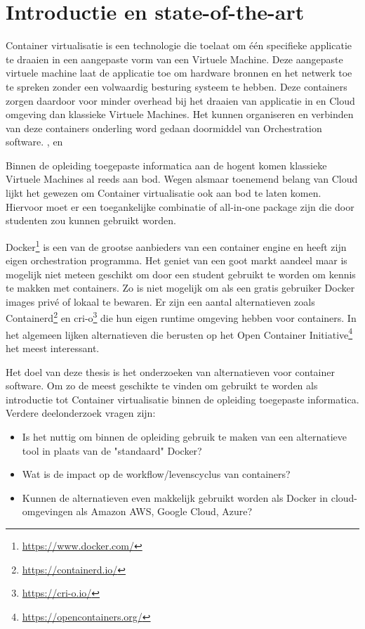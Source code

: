 
\section{Introductie en state-of-the-art} %
\label{sec:introductie}

Container virtualisatie is een technologie die toelaat om één specifieke applicatie te draaien in een aangepaste vorm van een Virtuele Machine. Deze aangepaste virtuele machine laat de applicatie toe om hardware bronnen en het netwerk toe te spreken zonder een volwaardig besturing systeem te hebben. Deze containers zorgen daardoor voor minder overhead bij het draaien van applicatie in en Cloud omgeving dan klassieke Virtuele Machines. Het kunnen organiseren en verbinden van deze containers onderling word gedaan doormiddel van Orchestration software. \autocite{eder2016hypervisor}, \autocite{silva2018cont} en \autocite{truyen2019comprehensive}

Binnen de opleiding toegepaste informatica aan de hogent komen klassieke Virtuele Machines al reeds aan bod. Wegen alsmaar toenemend belang van Cloud lijkt het gewezen om Container virtualisatie ook aan bod te laten komen. Hiervoor moet er een toegankelijke combinatie of all-in-one package zijn die door studenten zou kunnen gebruikt worden.

Docker\footnote{\url{https://www.docker.com/}} is een van de grootse aanbieders van een container engine en heeft zijn eigen orchestration programma. Het geniet van een goot markt aandeel maar is mogelijk niet meteen geschikt om door een student gebruikt te worden om kennis te makken met containers. Zo is niet mogelijk om als een gratis gebruiker Docker images privé of lokaal te bewaren. Er zijn een aantal alternatieven zoals Containerd\footnote{\url{https://containerd.io/}} en cri-o\footnote{\url{https://cri-o.io/}} die hun eigen runtime omgeving hebben voor containers. In het algemeen lijken  alternatieven die berusten op het Open Container Initiative\footnote{\url{https://opencontainers.org/}} het meest interessant.
 
Het doel van deze thesis is het onderzoeken van alternatieven voor container software. Om zo de meest geschikte te vinden om gebruikt te worden als introductie tot Container virtualisatie binnen de opleiding toegepaste informatica. Verdere deelonderzoek vragen zijn:
\begin{itemize}
    \item Is het nuttig om binnen de opleiding gebruik te maken van een alternatieve tool  in plaats van de "standaard" Docker?
    \item Wat is de impact op de workflow/levenscyclus van containers?
    \item Kunnen de alternatieven even makkelijk gebruikt worden als Docker in cloud-omgevingen als Amazon AWS, Google Cloud, Azure?
\end{itemize}

